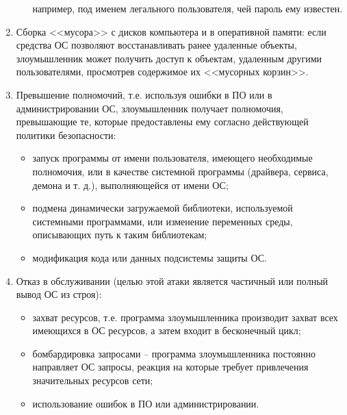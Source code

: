 \begin{enumerate}
\begin{itemize}
  например, под именем легального пользователя, чей пароль ему известен.    
  \end{itemize}
  \item Сборка <<мусора>> с дисков компьютера и в оперативной памяти: 
  если средства ОС позволяют восстанавливать ранее удаленные объекты,
  злоумышленник может получить доступ к объектам, удаленным другими
  пользователями, просмотрев содержимое их <<мусорных корзин>>.
  \item Превышение полномочий, т.е. используя ошибки в ПО или в
  администрировании ОС, злоумышленник получает полномочия, превышающие те,
  которые предоставлены ему согласно действующей политики безопасности:
  \begin{itemize}
    \item запуск программы от имени пользователя, имеющего необходимые
    полномочия, или в качестве системной программы (драйвера, сервиса, демона и
    т. д.), выполняющейся от имени ОС;
	\item подмена динамически загружаемой библиотеки, используемой системными
	программами, или изменение переменных среды, описывающих путь к таким
	библиотекам; 
	\item модификация кода или данных подсистемы защиты ОС.
  \end{itemize}

  \item Отказ в обслуживании (целью этой атаки является частичный или полный
  вывод ОС из строя):
  \begin{itemize}
    \item захват ресурсов, т.е. программа злоумышленника производит захват всех
    имеющихся в ОС ресурсов, а затем входит в бесконечный цикл;
	\item бомбардировка запросами -- программа злоумышленника постоянно направляет
	ОС запросы, реакция на которые требует привлечения значительных ресурсов сети;
	\item использование ошибок в ПО или администрировании.~\cite{zapechnikov}
  \end{itemize}

\end{enumerate}